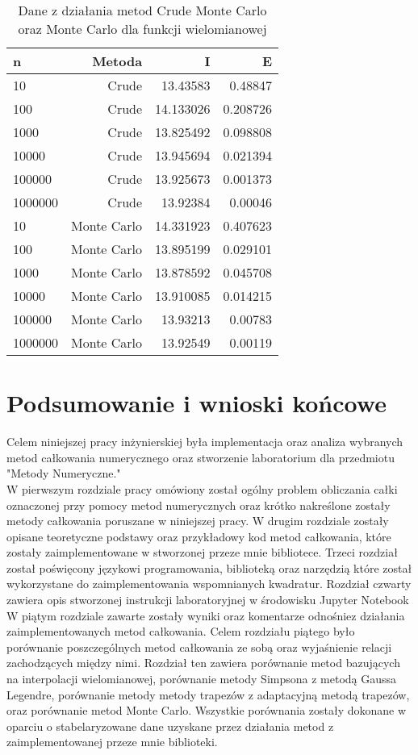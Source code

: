 \documentclass[12pt,twoside]{article}
\begin{document}
\begin{table}[H]
\centering 
\caption{Dane z działania metod Crude Monte Carlo oraz Monte Carlo dla funkcji wielomianowej}
\label{tabela9.7}
\begin{tabular}{lrrr}
\toprule
{n} & Metoda &  I &  E \\
\midrule
10  &     Crude & 13.43583  &   0.48847 \\
100  &     Crude & 14.133026 &   0.208726 \\
1000  &    Crude & 13.825492  &   0.098808  \\
10000  &    Crude & 13.945694  &   0.021394  \\
100000  &    Crude & 13.925673 &    0.001373   \\
1000000  &    Crude & 13.92384 &    0.00046   \\
\midrule
10  &     Monte Carlo & 14.331923  &   0.407623 \\
100  &     Monte Carlo & 13.895199 &   0.029101\\
1000  &    Monte Carlo & 13.878592   &   0.045708  \\
10000  &    Monte Carlo & 13.910085  &   0.014215  \\
100000  &    Monte Carlo & 13.93213 &    0.00783   \\
1000000  &    Monte Carlo & 13.92549 &    0.00119   \\
\bottomrule
\end{tabular}
\end{table}


\section{Podsumowanie i wnioski końcowe}

Celem niniejszej pracy inżynierskiej była implementacja oraz analiza wybranych metod całkowania numerycznego oraz stworzenie laboratorium dla przedmiotu "Metody Numeryczne."\\
	W pierwszym rozdziale pracy omówiony został ogólny problem obliczania całki oznaczonej przy pomocy metod numerycznych oraz krótko nakreślone zostały metody całkowania poruszane w niniejszej pracy. 
	W drugim rozdziale zostały opisane teoretyczne podstawy oraz przykładowy kod metod całkowania, które zostały zaimplementowane w stworzonej przeze mnie bibliotece. 
	Trzeci rozdział został poświęcony językowi programowania, biblioteką oraz narzędzią które został wykorzystane do zaimplementowania wspomnianych kwadratur.
	Rozdział czwarty zawiera opis stworzonej instrukcji laboratoryjnej w środowisku Jupyter Notebook
	W piątym rozdziale zawarte zostały wyniki oraz komentarze odnośniez działania zaimplementowanych metod całkowania.
	Celem rozdziału piątego było porównanie poszczególnych metod całkowania ze sobą  oraz wyjaśnienie relacji zachodzących między nimi. Rozdział ten zawiera porównanie metod bazujących na interpolacji wielomianowej, porównanie metody Simpsona z metodą Gaussa Legendre, porównanie metody metody trapezów z adaptacyjną metodą trapezów, oraz porównanie metod Monte Carlo. Wszystkie porównania zostały dokonane w oparciu o stabelaryzowane dane uzyskane przez działania metod z zaimplementowanej przeze mnie biblioteki. 
\end{document}
